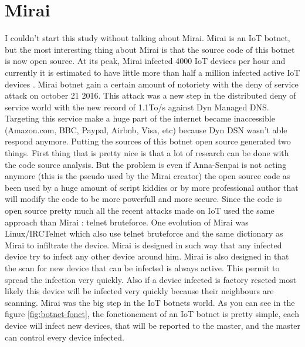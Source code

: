 \documentclass{report}
\begin{document}
\section{Mirai}
I couldn't start this study without talking about Mirai. Mirai is an IoT botnet, but the most interesting thing about Mirai is that the source code of this botnet is now open source. At its peak, Mirai infected 4000 IoT devices
per hour and currently it is estimated to have little more than half a million infected active IoT devices \autocite{angrishi2017turning}. Mirai botnet gain a certain amount of notoriety with the deny of service attack on october 21 2016. This attack was a new step in the distributed deny of service world with the new record of 1.1To/s against Dyn Managed DNS. Targeting this service make a huge part of the internet became inaccessible (Amazon.com, BBC, Paypal, Airbnb, Visa, etc) because Dyn DSN wasn't able respond anymore.\newline
Putting the sources of this botnet open source generated two things. First thing that is pretty nice is that a lot of research can be done with the code source analysis. But the problem is even if Anna-Senpai is not acting anymore (this is the pseudo used by the Mirai creator) the open source code as been used by a huge amount of script kiddies or by more professional author that will modify the code to be more powerfull and more secure. Since the code is open source pretty much all the recent attacks made on IoT used the same approach than Mirai : telnet bruteforce.
One evolution of Mirai was Linux/IRCTelnet which also use telnet bruteforce and the same dictionary as Mirai to infiltrate the device.\newline
\newline
Mirai is designed in such way that any infected device try to infect any other device around him. Mirai is also designed in that the scan for new device that can be infected is always active. This permit to spread the infection very quickly. Also if a device infected is factory reseted most likely this device will be infected very quickly because their neighbours are scanning. Mirai was the big step in the IoT botnets world.\newline
\newline
As you can see in the figure \ref{fig:botnet-fonct}, the fonctionement of an IoT botnet is pretty simple, each device will infect new devices, that will be reported to the master, and the master can control every device infected.
\newpage
\end{document}

